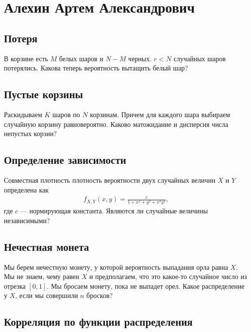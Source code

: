 \documentclass[12pt]{article}
\begin{document}
\section{Алехин Артем Александрович}

\subsection{Потеря}

В корзине есть $M$ белых шаров и $N - M$ черных. $r < N$ случайных шаров потерялись. Какова теперь вероятность вытащить белый шар?



\subsection{Пустые корзины}

Раскидываем $K$ шаров по $N$ корзинам. Причем для каждого шара выбираем случайную корзину равновероятно. Каково матожидание и дисперсия числа непустых корзин?



\subsection{Определение зависимости}

Совместная плотность плотность вероятности двух случайных величин $X$ и $Y$ определена как
\begin{align*}
    f_{X, Y}(x, y) = \frac{c}{1 + x^2 + y^2 + x^2y^2},
\end{align*}
где $c$ --- нормирующая константа. Являются ли случайные величины независимыми?



\subsection{Нечестная монета}

Мы берем нечестную монету, у которой вероятность выпадания орла равна $X$. Мы не знаем, чему равен $X$ и предполагаем, что это какое-то случайное число из отрезка $[0, 1]$. Мы бросаем монету, пока не выпадет орел. Какое распределение у $X$, если мы совершили $n$ бросков?



\subsection{Корреляция по функции распределения}
\end{document}
